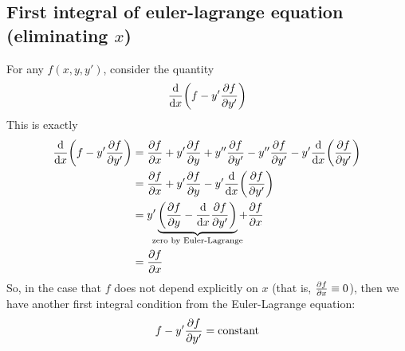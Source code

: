 \subsection{First integral of euler-lagrange equation (eliminating \(x\))}
For any \( f (x, y, y') \), consider the quantity
\[
	\dv{x}\qty(f - y' \pdv{f}{y'})
\]
This is exactly
\begin{align*}
	\dv{x}\qty(f - y' \pdv{f}{y'}) & = \pdv{f}{x} + y' \pdv{f}{y} + y''\pdv{f}{y'} - y'' \pdv{f}{y'} - y' \dv{x}\qty(\pdv{f}{y'})                     \\
	                               & = \pdv{f}{x} + y' \pdv{f}{y} - y' \dv{x}\qty(\pdv{f}{y'})                                                        \\
	                               & = y' \underbrace{\qty( \pdv{f}{y} - \dv{x}\pdv{f}{y'} )}_{\mathclap{\text{zero by Euler-Lagrange}}} + \pdv{f}{x} \\
	                               & = \pdv{f}{x}                                                                                                     \\
\end{align*}
So, in the case that \( f \) does not depend explicitly on \( x \) (that is, \( \pdv{f}{x} \equiv 0 \)), then we have another first integral condition from the Euler-Lagrange equation:
\[
	f - y' \pdv{f}{y'} = \text{constant}
\]

